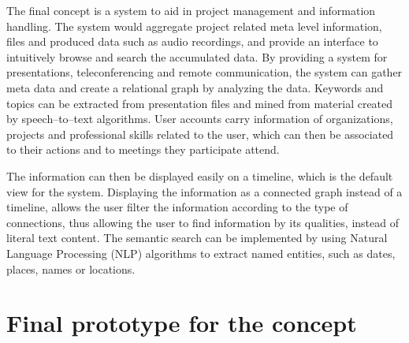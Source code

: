 \documentclass[english,12pt,a4paper,dvips]{article}
\begin{document}
The final concept is a system to aid in project management and information handling. The system would aggregate project related meta level information, files and produced data such as audio recordings, and provide an interface to intuitively browse and search the accumulated data. By providing a system for presentations, teleconferencing and remote communication, the system can gather meta data and create a relational graph by analyzing the data. Keywords and topics can be extracted from presentation files and mined from material created by speech--to--text algorithms. User accounts carry information of organizations, projects and professional skills related to the user, which can then be associated to their actions and to meetings they participate attend.

The information can then be displayed easily on a timeline, which is the default view for the system. Displaying the information as a connected graph instead of a timeline, allows the user filter the information according to the type of connections, thus allowing the user to find information by its qualities, instead of literal text content. The semantic search can be implemented by using Natural Language Processing (NLP) algorithms to extract named entities, such as dates, places, names or locations.


\clearpage

\section{Final prototype for the concept}

\end{document}
